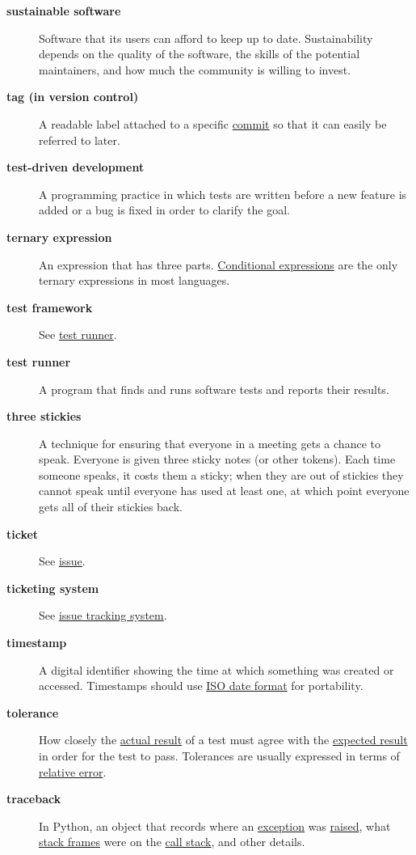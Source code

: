 \documentclass[
]{krantz}
\begin{document}
\begin{description}
\item[\textbf{sustainable software}]
Software that its users can afford to keep up to date. Sustainability depends on the quality of the software, the skills of the potential maintainers, and how much the community is willing to invest.
\item[\textbf{tag (in version control)}]
A readable label attached to a specific \protect\hyperlink{commit}{commit} so that it can easily be referred to later.
\item[\textbf{test-driven development}]
A programming practice in which tests are written before a new feature is added or a bug is fixed in order to clarify the goal.
\item[\textbf{ternary expression}]
An expression that has three parts. \protect\hyperlink{conditional_expression}{Conditional expressions} are the only ternary expressions in most languages.
\item[\textbf{test framework}]
See \protect\hyperlink{test_runner}{test runner}.
\item[\textbf{test runner}]
A program that finds and runs software tests and reports their results.
\item[\textbf{three stickies}]
A technique for ensuring that everyone in a meeting gets a chance to speak. Everyone is given three sticky notes (or other tokens). Each time someone speaks, it costs them a sticky; when they are out of stickies they cannot speak until everyone has used at least one, at which point everyone gets all of their stickies back.
\item[\textbf{ticket}]
See \protect\hyperlink{issue}{issue}.
\item[\textbf{ticketing system}]
See \protect\hyperlink{issue_tracking_system}{issue tracking system}.
\item[\textbf{timestamp}]
A digital identifier showing the time at which something was created or accessed. Timestamps should use \protect\hyperlink{iso_date_format}{ISO date format} for portability.
\item[\textbf{tolerance}]
How closely the \protect\hyperlink{actual_result}{actual result} of a test must agree with the \protect\hyperlink{expected_result}{expected result} in order for the test to pass. Tolerances are usually expressed in terms of \protect\hyperlink{relative_error}{relative error}.
\item[\textbf{traceback}]
In Python, an object that records where an \protect\hyperlink{exception}{exception} was \protect\hyperlink{raise_exception}{raised}, what \protect\hyperlink{stack_frame}{stack frames} were on the \protect\hyperlink{call_stack}{call stack}, and other details.

\end{description}
\end{document}
